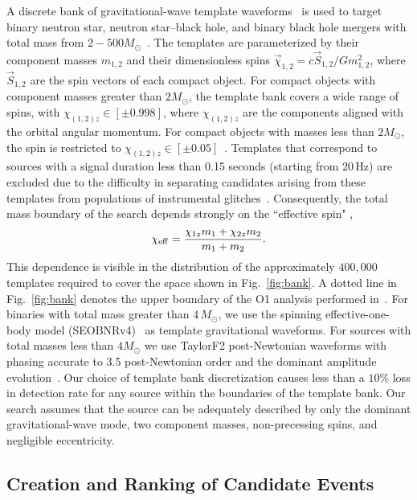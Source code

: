 A discrete bank of gravitational-wave template waveforms~\citep{Owen:1995tm,Owen:1998dk,Brown:2012qf} is used to target binary neutron star,
neutron star--black hole, and binary black hole mergers with total mass from $2-500 M_{\odot}$~\citep{DalCanton:2017ala}. The templates are
parameterized by their component masses $m_{1,2}$ and their dimensionless spins  $\vec{\chi}_{1,2} = c \vec{S}_{1,2}/G m_{1,2}^2$, where
$\vec{S}_{1,2}$ are the spin vectors of each compact object.  For compact objects with component
masses greater than $2 M_{\odot}$, the template bank covers a wide range of spins, with $\chi_{(1,2)z} \in [\pm 0.998]$, where $\chi_{(1,2)z}$ are the components aligned with the orbital angular momentum. For compact objects
with masses less than  $2 M_{\odot}$, the spin is restricted to $\chi_{(1,2)z} \in [\pm 0.05]$~\citep{Brown:2012qf}. Templates that correspond
to sources with a signal duration less than 0.15 seconds (starting from $20\,$Hz) are excluded due to the difficulty in separating candidates arising from
these templates from populations of instrumental glitches~\citep{DalCanton:2017ala}. Consequently, the total mass boundary of the search
depends strongly on the ``effective spin" \citep{Racine:2008qv, Ajith:2009bn},
%
\begin{equation}
\chi_{\mathrm{eff}} = \frac{\chi_{1z} m_1 + \chi_{2z} m_2}{m_1+m_2}.
\end{equation}
%
This dependence is visible in the distribution of the approximately $400,000$ templates required to cover the space shown in Fig.~\ref{fig:bank}. A dotted line in Fig.~\ref{fig:bank} denotes the upper boundary of the O1 analysis performed in~\cite{TheLIGOScientific:2016pea}. For binaries with total mass greater than $4\,M_\odot$, we use the spinning effective-one-body model (SEOBNRv4)~\citep{Taracchini:2013,Bohe:2016gbl} as template gravitational waveforms. For sources with total masses less than $4M_{\odot}$ we use TaylorF2 post-Newtonian waveforms with phasing accurate to 3.5 post-Newtonian order and the dominant amplitude evolution~\citep{Sathyaprakash:1991mt,Droz:1999qx,Blanchet:2002av,Faye:2012we}. Our choice of template bank discretization causes less than a $10\%$ loss in detection rate for any source within the boundaries of the template bank. Our search assumes that the source can be adequately described by only the dominant gravitational-wave mode, two component masses, non-precessing spins, and negligible eccentricity.

\subsection{Creation and Ranking of Candidate Events}

